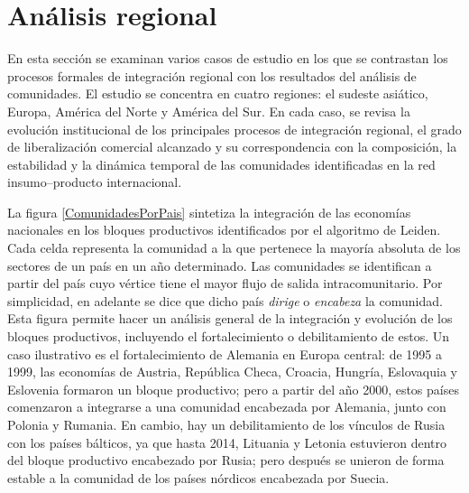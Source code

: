 

\section{Análisis regional}

En esta sección se examinan varios casos de estudio en los que se contrastan los procesos formales de integración regional con los resultados del análisis de comunidades. El estudio se concentra en cuatro regiones: el sudeste asiático, Europa, América del Norte y América del Sur. En cada caso, se revisa la evolución institucional de los principales procesos de integración regional, el grado de liberalización comercial alcanzado y su correspondencia con la composición, la estabilidad y la dinámica temporal de las comunidades identificadas en la red insumo--producto internacional.

La figura \ref{ComunidadesPorPais} sintetiza la integración de las economías nacionales en los bloques productivos identificados por el algoritmo de Leiden. Cada celda representa la comunidad a la que pertenece la mayoría absoluta de los sectores de un país en un año determinado. Las comunidades se identifican a partir del país cuyo vértice tiene el mayor flujo de salida intracomunitario. Por simplicidad, en adelante se dice que dicho país \textit{dirige} o \textit{encabeza} la comunidad. Esta figura permite hacer un análisis general de la integración y evolución de los bloques productivos, incluyendo el fortalecimiento o debilitamiento de estos. Un caso ilustrativo es el fortalecimiento de Alemania en Europa central: de 1995 a 1999, las economías de Austria, República Checa, Croacia, Hungría, Eslovaquia y Eslovenia formaron un bloque productivo; pero a partir del año 2000, estos países comenzaron a integrarse a una comunidad encabezada por Alemania, junto con Polonia y Rumania. En cambio, hay un debilitamiento de los vínculos de Rusia con los países bálticos, ya que hasta 2014, Lituania y Letonia estuvieron dentro del bloque productivo encabezado por Rusia; pero después se unieron de forma estable a la comunidad de los países nórdicos encabezada por Suecia.



